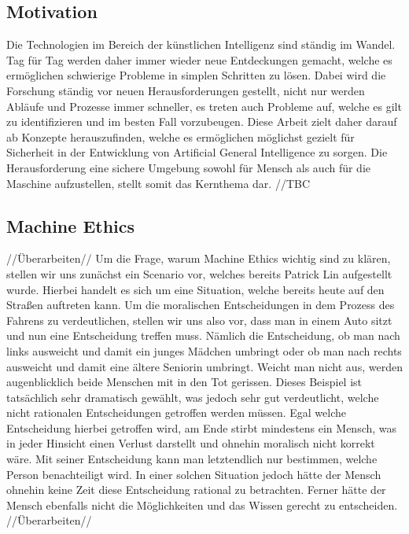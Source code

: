     \subsection{Motivation}
    Die Technologien im Bereich der künstlichen Intelligenz sind ständig im Wandel. Tag für Tag
    werden daher immer wieder neue Entdeckungen gemacht, welche es ermöglichen schwierige Probleme
    in simplen Schritten zu lösen. Dabei wird die Forschung ständig vor neuen Herausforderungen
    gestellt, nicht nur werden Abläufe und Prozesse immer schneller, es treten auch Probleme auf,
    welche es gilt zu identifizieren und im besten Fall vorzubeugen. Diese Arbeit zielt daher
    darauf ab Konzepte herauszufinden, welche es ermöglichen möglichst gezielt für Sicherheit
    in der Entwicklung von Artificial General Intelligence zu sorgen. Die Herausforderung eine
    sichere Umgebung sowohl für Mensch als auch für die Maschine aufzustellen, stellt somit das
    Kernthema dar. //TBC

    \subsection{Machine Ethics}
    //Überarbeiten//    
    Um die Frage, warum Machine Ethics wichtig sind zu klären, stellen wir uns zunächst ein
    Scenario vor, welches bereits Patrick Lin \cite[p. 70]{maurer_gerdes_lenz_winner_2015}
    aufgestellt wurde. Hierbei handelt es sich um eine Situation, welche bereits heute auf den
    Straßen auftreten kann. Um die moralischen Entscheidungen in dem Prozess des Fahrens zu
    verdeutlichen, stellen wir uns also vor, dass man in einem Auto sitzt und nun eine 
    Entscheidung treffen muss. Nämlich die Entscheidung, ob man nach links ausweicht und damit
    ein junges Mädchen umbringt oder ob man nach rechts ausweicht und damit eine ältere 
    Seniorin umbringt. Weicht man nicht aus, werden augenblicklich beide Menschen mit in den
    Tot gerissen. Dieses Beispiel ist tatsächlich sehr dramatisch gewählt, was jedoch sehr gut
    verdeutlicht, welche nicht rationalen Entscheidungen getroffen werden müssen. Egal welche 
    Entscheidung hierbei getroffen wird, am Ende stirbt mindestens ein Mensch, was in jeder 
    Hinsicht einen Verlust darstellt und ohnehin moralisch nicht korrekt wäre. \cite[p. 70]{maurer_gerdes_lenz_winner_2015}
    Mit seiner Entscheidung kann man letztendlich nur bestimmen, welche Person benachteiligt 
    wird. In einer solchen Situation jedoch hätte der Mensch ohnehin keine Zeit diese Entscheidung
    rational zu betrachten. Ferner hätte der Mensch ebenfalls nicht die Möglichkeiten und 
    das Wissen gerecht zu entscheiden.
    //Überarbeiten// 
    
